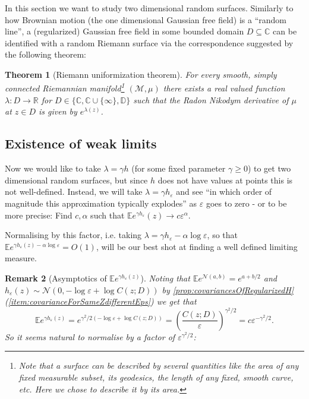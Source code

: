 \documentclass[11pt,reqno]{amsart}
\numberwithin{equation}{section}
\newtheorem{thm}{Theorem}[section]
\newtheorem{rem}[thm]{Remark}
\newcommand{\eps}{\varepsilon}
\begin{document}
In this section we want to study two dimensional random surfaces. Similarly to how Brownian motion (the one dimensional Gaussian free field) is a ``random line'', a (regularized) Gaussian free field in some bounded domain $D\subseteq\mathbb C$ can be identified with a random Riemann surface via the correspondence suggested by the following theorem:
\begin{thm}[Riemann uniformization theorem]
	For every smooth, simply connected Riemannian manifold\footnote{Note that a surface can be described by several quantities like the area of any fixed measurable subset, its geodesics, the length of any fixed, smooth curve, etc. Here we chose to describe it by its area.} $(\mathcal M,\mu)$ there exists a real valued function $\lambda:D\rightarrow\mathbb R$ for $D\in\{\mathbb C,\mathbb C\cup\{\infty\},\mathbb D\}$ such that the Radon Nikodym derivative of $\mu$ at $z\in D$ is given by $e^{\lambda(z)}$.
\end{thm}

\subsection{Existence of weak limits}

Now we would like to take $\lambda = \gamma h$ (for some fixed parameter $\gamma\geq 0$) to get two dimensional random surfaces, but since $h$ does not have values at points this is not well-defined. Instead, we will take $\lambda = \gamma h_\eps$ and see ``in which order of magnitude this approximation typically explodes'' as $\eps$ goes to zero - or to be more precise: Find $c,\alpha$ such that $\mathbb E e^{\gamma h_\eps}(z) \rightarrow c\eps^\alpha$.

Normalising by this factor, i.e. taking $\lambda=\gamma h_\eps - \alpha\log\eps$, so that $\mathbb E e^{\gamma h_\eps(z) - \alpha\log\eps}=O(1)$, will be our best shot at finding a well defined limiting measure.

\begin{rem}[Asymptotics of $\mathbb E e^{\gamma h_\eps(z)}$]\label{rem:asymptoticsofregularizedGFF}
	Noting that $\mathbb E e^{\mathcal N(a,b)}=e^{a+b/2}$ and $h_\eps(z)\sim\mathcal N(0,-\log\eps+\log C(z;D))$ by \ref{prop:covariancesOfRegularizedH}(\ref{item:covarianceForSameZdifferentEps}) we get that $$\mathbb E e^{\gamma h_\eps(z)} = e^{\gamma^2/2(-\log\eps+\log C(z;D))}=\left(\frac{C(z;D)}{\eps}\right)^{\gamma^2/2} = c\eps^{-\gamma^2/2}.$$
	So it seems natural to normalise by a factor of $\eps^{\gamma^2/2}$:
\end{rem}
\end{document}

